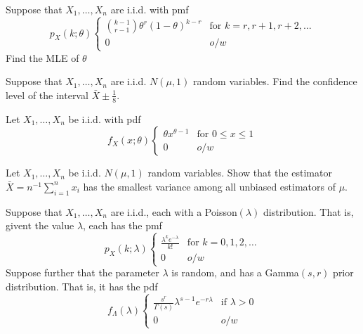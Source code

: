 \documentclass[addpoints]{exam}
\begin{document}
	\begin{questions}	
		\question[5] Suppose that $X_{1}, \dots, X_{n}$ are i.i.d. with pmf $$p_{X}(k;\theta) \begin{cases}
			\binom{k-1}{r-1}\theta^{r}(1-\theta)^{k-r} & \text{for $k = r, r+1, r+2, \dots$} \\ 0 & o/w
		\end{cases}$$ Find the MLE of $\theta$
			
		\question[5] Suppose that $X_{1}, \dots, X_{n}$ are i.i.d. $N(\mu, 1)$ random variables. Find the confidence level of the interval $\bar{X} \pm \frac{1}{8}$.
		\newpage

		\question[10] Let $X_{1}, \dots, X_{n}$ be i.i.d. with pdf $$f_{X}(x;\theta) \begin{cases}
			\theta x^{\theta - 1} & \text{for $0 \leq x \leq 1$} \\ 0 & o/w
		\end{cases}$$ 
		
		\question[5] Let $X_{1}, \dots, X_{n}$ be i.i.d. $N(\mu, 1)$ random variables. Show that the estimator $\bar{X} = n^{-1}\sum_{i=1}^{n}x_{i}$ has the smallest variance among all unbiased estimators of $\mu$.
		\newpage
			
		\question[10] Suppose that $X_{1}, \dots, X_{n}$ are i.i.d., each with a Poisson$(\lambda)$ distribution. That is, givent the value $\lambda$, each has the pmf $$p_{X}(k;\lambda) \begin{cases}
			\frac{\lambda^{k}e^{-\lambda}}{k!} & \text{for $k = 0,1,2, \dots$} \\ 0 & o/w
		\end{cases}$$ Suppose further that the parameter $\lambda$ is random, and has a Gamma$(s,r)$ prior distribution. That is, it has the pdf $$f_{\Lambda}(\lambda) \begin{cases}
			\frac{s^{r}}{\Gamma(s)}\lambda^{s-1}e^{-r\lambda} & \text{if $\lambda > 0$} \\ 0 & o/w
		\end{cases}$$
			\begin{parts}

\end{parts}
\end{questions}
\end{document}
